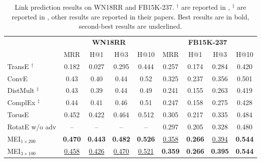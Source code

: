 \documentclass{ecai}
\theoremstyle{plain}  \newtheorem{thm}{Theorem}  \newtheorem{lem}[thm]{Lemma}  \newtheorem{prop}[thm]{Proposition}
\theoremstyle{remark}  \newtheorem*{rem}{Remark}
\begin{document}
\begin{table*}

	\caption[Link prediction results on WN18RR and FB15K-237.]{Link prediction results on WN18RR and FB15K-237. $ ^\dagger $ are reported in \cite{ebisu_generalizedtranslationbasedembedding_2019}, $ ^\ddagger $ are reported in \cite{dettmers_convolutional2dknowledge_2018}, other results are reported in their papers. Best results are in bold, second-best results are underlined.}
	\label{tab:result_hard}
	\centering	
	\begin{adjustbox}{max width=\textwidth}
		\begin{tabular}{@{\extracolsep{2pt}}lcccccccc@{}}
			
			\toprule
			
			& \multicolumn{4}{c}{\textbf{WN18RR}} & \multicolumn{4}{c}{\textbf{FB15K-237}} \\
			\cmidrule(lr){2-5} \cmidrule(lr){6-9}
			& MRR & H@1 & H@3 & H@10 & MRR & H@1 & H@3 & H@10 \\ 
			\hline
			
			TransE \cite{bordes_translatingembeddingsmodeling_2013} $ ^\dagger $ & 0.182 & 0.027 & 0.295 & 0.444 & 0.257 & 0.174 & 0.284 & 0.420 \\


ConvE \cite{dettmers_convolutional2dknowledge_2018} & 0.43 & 0.40 & 0.44 & 0.52 & 0.325 & 0.237 & 0.356 & 0.501 \\


			DistMult \cite{yang_embeddingentitiesrelations_2015} $ ^\ddagger $ & 0.43 & 0.39 & 0.44 & 0.49 & 0.241 & 0.155 & 0.263 & 0.419 \\
			ComplEx \cite{trouillon_complexembeddingssimple_2016} $ ^\ddagger $ & 0.44 & 0.41 & 0.46 & 0.51 & 0.247 & 0.158 & 0.275 & 0.428 \\
			
TorusE \cite{ebisu_generalizedtranslationbasedembedding_2019} & 0.452 & 0.422 & 0.464 & 0.512 & 0.305 & 0.217 & 0.335 & 0.484 \\
			RotatE w/o adv \cite{sun_rotateknowledgegraph_2019} & -- & -- & -- & -- & 0.297 & 0.205 & 0.328 & 0.480 \\  

\hline
			






			MEI$ _{1 \times 200} $ & \textbf{0.470} & \textbf{0.443} & \textbf{0.482} & \textbf{0.526} & \underline{0.358} & \textbf{0.266} & \underline{0.394} & \textbf{0.544} \\  



			MEI$ _{3 \times 100} $ & \underline{0.458} & \underline{0.426} & \underline{0.470} & \underline{0.521} & \textbf{0.359} & \textbf{0.266} & \textbf{0.395} & \textbf{0.544} \\  

			\bottomrule
			
		\end{tabular}
	\end{adjustbox}
\end{table*}
\end{document}

